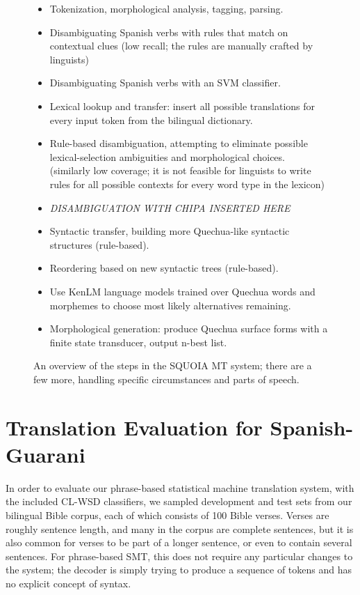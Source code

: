 \begin{figure}
  \begin{itemize}
  \item Tokenization, morphological analysis, tagging, parsing.
  \item Disambiguating Spanish verbs with rules that match on contextual clues
  (low recall; the rules are manually crafted by linguists)
  \item Disambiguating Spanish verbs with an SVM classifier.
  \item Lexical lookup and transfer: insert all possible translations for every
  input token from the bilingual dictionary.
  \item Rule-based disambiguation, attempting to eliminate possible
  lexical-selection ambiguities and morphological choices. (similarly low
  coverage; it is not feasible for linguists to write rules for all possible
  contexts for every word type in the lexicon)
  \item \emph{DISAMBIGUATION WITH CHIPA INSERTED HERE}
  \item Syntactic transfer, building more Quechua-like syntactic structures
  (rule-based).
  \item Reordering based on new syntactic trees (rule-based).
  \item Use KenLM language models trained over Quechua words and morphemes to
  choose most likely alternatives remaining.
  \item Morphological generation: produce Quechua surface forms with a finite
  state transducer, output n-best list.
  \end{itemize}

  \caption{An overview of the steps in the SQUOIA MT system; there are a few
  more, handling specific circumstances and parts of speech.}
  \label{fig:squoia-steps}
\end{figure}


\section{Translation Evaluation for Spanish-Guarani}

In order to evaluate our phrase-based statistical machine translation system,
with the included CL-WSD classifiers, we sampled development and test sets from
our bilingual Bible corpus, each of which consists of 100 Bible verses. Verses
are roughly sentence length, and many in the corpus are complete sentences, but
it is also common for verses to be part of a longer sentence, or even to
contain several sentences.  For phrase-based SMT, this does not require any
particular changes to the system; the decoder is simply trying to produce a
sequence of tokens and has no explicit concept of syntax.


